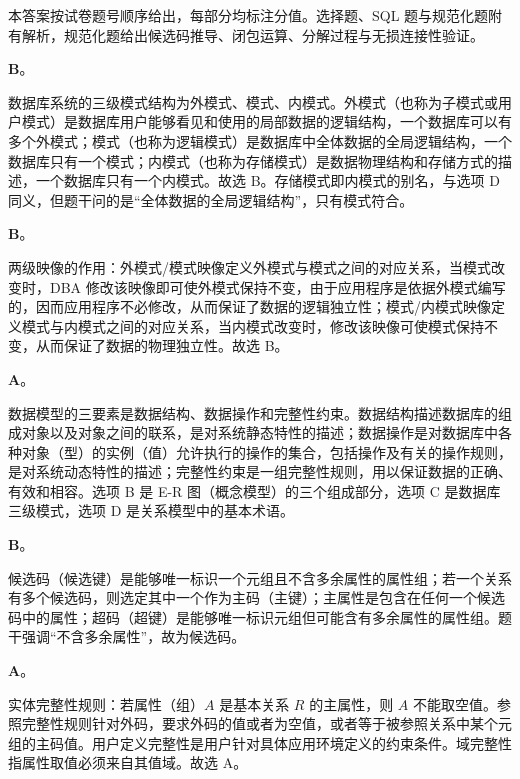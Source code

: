 \documentclass[a4paper,11pt]{article}
\begin{document}

本答案按试卷题号顺序给出，每部分均标注分值。选择题、SQL 题与规范化题附有解析，规范化题给出候选码推导、闭包运算、分解过程与无损连接性验证。


\q \textbf{B}。
\begin{analysis}
数据库系统的三级模式结构为外模式、模式、内模式。外模式（也称为子模式或用户模式）是数据库用户能够看见和使用的局部数据的逻辑结构，一个数据库可以有多个外模式；模式（也称为逻辑模式）是数据库中全体数据的全局逻辑结构，一个数据库只有一个模式；内模式（也称为存储模式）是数据物理结构和存储方式的描述，一个数据库只有一个内模式。故选 B。存储模式即内模式的别名，与选项 D 同义，但题干问的是“全体数据的全局逻辑结构”，只有模式符合。
\end{analysis}

\q \textbf{B}。
\begin{analysis}
两级映像的作用：外模式/模式映像定义外模式与模式之间的对应关系，当模式改变时，DBA 修改该映像即可使外模式保持不变，由于应用程序是依据外模式编写的，因而应用程序不必修改，从而保证了数据的逻辑独立性；模式/内模式映像定义模式与内模式之间的对应关系，当内模式改变时，修改该映像可使模式保持不变，从而保证了数据的物理独立性。故选 B。
\end{analysis}

\q \textbf{A}。
\begin{analysis}
数据模型的三要素是数据结构、数据操作和完整性约束。数据结构描述数据库的组成对象以及对象之间的联系，是对系统静态特性的描述；数据操作是对数据库中各种对象（型）的实例（值）允许执行的操作的集合，包括操作及有关的操作规则，是对系统动态特性的描述；完整性约束是一组完整性规则，用以保证数据的正确、有效和相容。选项 B 是 E-R 图（概念模型）的三个组成部分，选项 C 是数据库三级模式，选项 D 是关系模型中的基本术语。
\end{analysis}

\q \textbf{B}。
\begin{analysis}
候选码（候选键）是能够唯一标识一个元组且不含多余属性的属性组；若一个关系有多个候选码，则选定其中一个作为主码（主键）；主属性是包含在任何一个候选码中的属性；超码（超键）是能够唯一标识元组但可能含有多余属性的属性组。题干强调“不含多余属性”，故为候选码。
\end{analysis}

\q \textbf{A}。
\begin{analysis}
实体完整性规则：若属性（组）$A$ 是基本关系 $R$ 的主属性，则 $A$ 不能取空值。参照完整性规则针对外码，要求外码的值或者为空值，或者等于被参照关系中某个元组的主码值。用户定义完整性是用户针对具体应用环境定义的约束条件。域完整性指属性取值必须来自其值域。故选 A。
\end{analysis}
\end{document}

